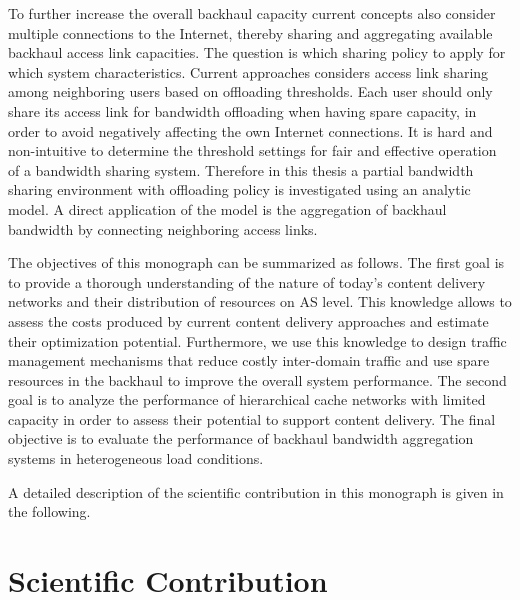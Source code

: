 To further increase the overall backhaul capacity current concepts also consider multiple connections to the Internet, thereby sharing and aggregating available backhaul access link capacities.
The question is which sharing policy to apply for which system characteristics.
Current approaches considers access link sharing among neighboring users based on offloading thresholds.
Each user should only share its access link for bandwidth offloading when having spare capacity, in order to avoid negatively affecting the own Internet connections.
It is hard and non-intuitive to determine the threshold settings for fair and effective operation of a bandwidth sharing system.
Therefore in this thesis a partial bandwidth sharing environment with offloading policy is investigated using an analytic model.
A direct application of the model is the aggregation of backhaul bandwidth by connecting neighboring access links.

The objectives of this monograph can be summarized as follows.
The first goal is to provide a thorough understanding of the nature of today's content delivery networks and their distribution of resources on AS level.
This knowledge allows to assess the costs produced by current content delivery approaches and estimate their optimization potential.
Furthermore, we use this knowledge to design traffic management mechanisms that reduce costly inter-domain traffic and use spare resources in the backhaul to improve the overall system performance.
The second goal is to analyze the performance of hierarchical cache networks with limited capacity in order to assess their potential to support content delivery.
The final objective is to evaluate the performance of backhaul bandwidth aggregation systems in heterogeneous load conditions.

A detailed description of the scientific contribution in this monograph is given in the following.

\newpage
\section{Scientific Contribution}\label{sec:introduction:scientific_contribution}

